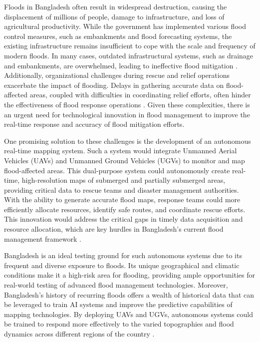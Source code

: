 \documentclass[conference]{IEEEtran}
\begin{document}
Floods in Bangladesh often result in widespread destruction, causing the displacement of millions of people, damage to infrastructure, and loss of agricultural productivity. While the government has implemented various flood control measures, such as embankments and flood forecasting systems, the existing infrastructure remains insufficient to cope with the scale and frequency of modern floods. In many cases, outdated infrastructural systems, such as drainage and embankments, are overwhelmed, leading to ineffective flood mitigation \cite{ref9}. Additionally, organizational challenges during rescue and relief operations exacerbate the impact of flooding. Delays in gathering accurate data on flood-affected areas, coupled with difficulties in coordinating relief efforts, often hinder the effectiveness of flood response operations \cite{ref10}. Given these complexities, there is an urgent need for technological innovation in flood management to improve the real-time response and accuracy of flood mitigation efforts.

One promising solution to these challenges is the development of an autonomous real-time mapping system. Such a system would integrate Unmanned Aerial Vehicles (UAVs) and Unmanned Ground Vehicles (UGVs) to monitor and map flood-affected areas. This dual-purpose system could autonomously create real-time, high-resolution maps of submerged and partially submerged areas, providing critical data to rescue teams and disaster management authorities. With the ability to generate accurate flood maps, response teams could more efficiently allocate resources, identify safe routes, and coordinate rescue efforts. This innovation would address the critical gaps in timely data acquisition and resource allocation, which are key hurdles in Bangladesh’s current flood management framework \cite{ref12}.

Bangladesh is an ideal testing ground for such autonomous systems due to its frequent and diverse exposure to floods. Its unique geographical and climatic conditions make it a high-risk area for flooding, providing ample opportunities for real-world testing of advanced flood management technologies. Moreover, Bangladesh’s history of recurring floods offers a wealth of historical data that can be leveraged to train AI systems and improve the predictive capabilities of mapping technologies. By deploying UAVs and UGVs, autonomous systems could be trained to respond more effectively to the varied topographies and flood dynamics across different regions of the country \cite{ref11}.
\end{document}
